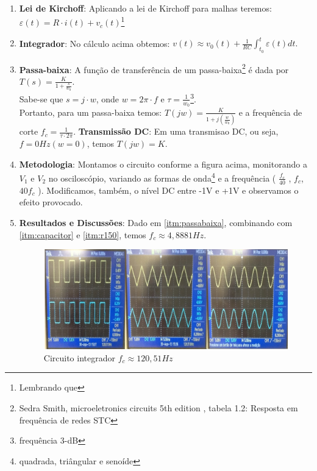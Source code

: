 \documentclass[12pt,letterpaper]{article}
\begin{document}
\begin{enumerate}[I]
\item \textbf{Lei de Kirchoff}: Aplicando a lei de Kirchoff para malhas teremos: $\varepsilon(t) = R\cdot i(t) + v_c(t)$\footnote{Lembrando que }
\item \textbf{Integrador}: No cálculo acima obtemos: $v(t)\approx v_0(t) + \frac{1}{RC} \int_{t_0}^{t} \varepsilon(t)dt.$
\item \label{itm:passabaixa} \textbf{Passa-baixa}: A função de transferência de um passa-baixa\footnote{Sedra Smith, microeletronics circuits 5th edition , tabela 1.2: Resposta em frequência de redes STC} é dada por $T(s) = \frac{K}{1 + \frac{s}{w_0}}$.\\
  Sabe-se que $s = j \cdot w$, onde $w = 2\pi \cdot f$ e $\tau = \frac{1}{w_0}$\footnote{frequência 3-dB}.\\
Portanto, para um passa-baixa temos: $T(jw) = \frac{K}{1 + j(\frac{w}{w_0})}$ e a frequência de corte $f_c = \frac{1}{\tau \cdot 2\pi}$.
\subitem \label{itm:intdc} \textbf{Transmissão DC}: Em uma transmisao DC, ou seja, $f = 0Hz (w = 0)$, temos $T(jw) = K$.
\item \textbf{Metodologia}: Montamos o circuito conforme a figura acima, monitorando a $V_1$ e $V_2$ no osciloscópio, variando as formas de onda\footnote{quadrada, triângular e senoíde} e a frequência ( $\frac{f_c}{40}$ , $f_c$, $40f_c$ ). Modificamos, também, o nível DC entre -1V e +1V e observamos o efeito provocado.
\item \label{itm:intred} \textbf{Resultados e Discussões}: Dado em \ref{itm:passabaixa}, combinando com \ref{itm:capacitor} e \ref{itm:r150}, temos $f_c \approx 4,8881Hz$.
\begin{figure}[!htb]
  \centering
  \label{fd40int}
  \includegraphics[scale=0.52]{img/fd40int.jpg}
  \caption{Circuito integrador $f_c \approx 120,51Hz$}
\end{figure}
\begin{figure}[!htb]

\end{figure}
\end{enumerate}
\end{document}
